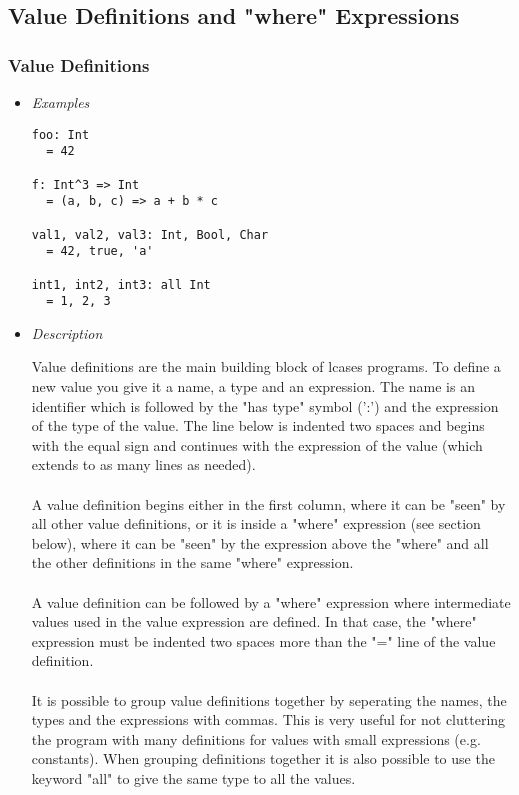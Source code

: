 \documentclass{article}
\begin{document}
\subsection{Value Definitions and "where" Expressions}
\label{subsec:valdefswhere}

\subsubsection{Value Definitions}
\label{subsubsec:valdefs}

\begin{itemize}

\item \textit{Examples}

\begin{verbatim}
foo: Int
  = 42

f: Int^3 => Int
  = (a, b, c) => a + b * c

val1, val2, val3: Int, Bool, Char
  = 42, true, 'a'

int1, int2, int3: all Int
  = 1, 2, 3
\end{verbatim}

\item \textit{Description}

Value definitions are the main building block of lcases programs. To define a
new value you give it a name, a type and an expression. The name is an
identifier which is followed by the "has type" symbol (':') and the expression
of the type of the value. The line below is indented two spaces and begins with
the equal sign and continues with the expression of the value (which extends to
as many lines as needed).
\\\\
A value definition begins either in the first column, where it can be "seen" by
all other value definitions, or it is inside a "where" expression (see section
below), where it can be "seen" by the expression above the "where" and all the
other definitions in the same "where" expression.
\\\\
A value definition can be followed by a "where" expression where intermediate
values used in the value expression are defined. In that case, the "where"
expression must be indented two spaces more than the "=" line of the value
definition.
\\\\
It is possible to group value definitions together by seperating the names, the
types and the expressions with commas. This is very useful for not cluttering
the program with many definitions for values with small expressions (e.g.
constants).  When grouping definitions together it is also possible to use the
keyword "all" to give the same type to all the values.


\end{itemize}
\end{document}
